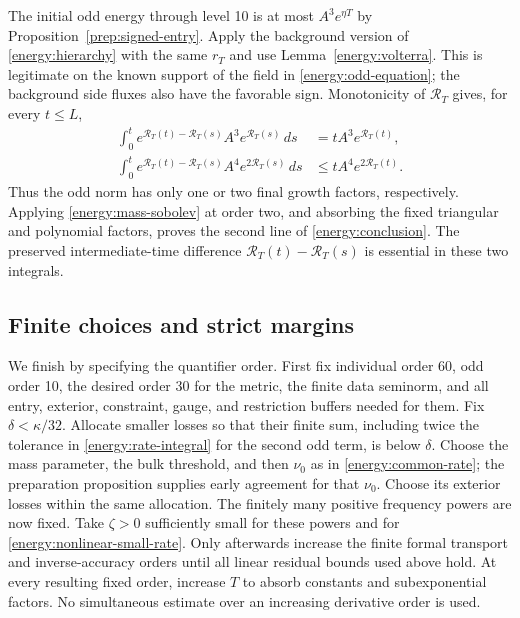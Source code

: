 The initial odd energy through level 10 is at most
\(A^3e^{\eta T}\) by Proposition~\ref{prep:signed-entry}. Apply
the background version of \eqref{energy:hierarchy} with the same
\(r_T\) and use Lemma~\ref{energy:volterra}. This is legitimate on
the known support of the field in \eqref{energy:odd-equation}; the
background side fluxes also have the favorable sign. Monotonicity of
\(\mathcal R_T\) gives, for every \(t\le L\),
\begin{align}
 \int_0^t e^{\mathcal R_T(t)-\mathcal R_T(s)}
                 A^3e^{\mathcal R_T(s)}\,ds
       &=tA^3e^{\mathcal R_T(t)},\label{energy:duhamel-one}\\
 \int_0^t e^{\mathcal R_T(t)-\mathcal R_T(s)}
                 A^4e^{2\mathcal R_T(s)}\,ds
       &\le tA^4e^{2\mathcal R_T(t)}.\label{energy:duhamel-two}
\end{align}
Thus the odd norm has only one or two final growth factors,
respectively. Applying \eqref{energy:mass-sobolev} at order two,
and absorbing the fixed triangular and polynomial factors, proves
the second line of \eqref{energy:conclusion}. The preserved
intermediate-time difference
\(\mathcal R_T(t)-\mathcal R_T(s)\) is essential in these two
integrals.

\subsection{Finite choices and strict margins}

We finish by specifying the quantifier order. First fix individual
order 60, odd order 10, the desired order 30 for the metric, the
finite data seminorm, and all entry, exterior, constraint, gauge, and
restriction buffers needed for them. Fix \(\delta<\kappa/32\).
Allocate smaller losses so that their finite sum, including twice
the tolerance in \eqref{energy:rate-integral} for the second odd
term, is below \(\delta\). Choose the mass parameter, the bulk
threshold, and then \(\nu_0\) as in
\eqref{energy:common-rate}; the preparation proposition supplies
early agreement for that \(\nu_0\). Choose its exterior losses
within the same allocation. The finitely many positive frequency
powers are now fixed. Take \(\zeta>0\) sufficiently small for these
powers and for \eqref{energy:nonlinear-small-rate}. Only afterwards
increase the finite formal transport and inverse-accuracy orders
until all linear residual bounds used above hold. At every resulting
fixed order, increase \(T\) to absorb constants and subexponential
factors. No simultaneous estimate over an increasing derivative
order is used.

